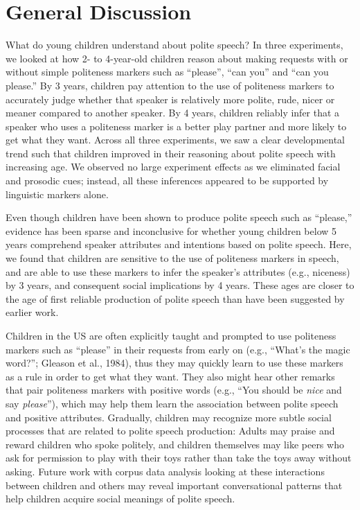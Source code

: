 \documentclass[10pt, letterpaper]{article}
\begin{document}
\section{General Discussion}\label{general-discussion}

What do young children understand about polite speech? In three
experiments, we looked at how 2- to 4-year-old children reason about
making requests with or without simple politeness markers such as
``please'', ``can you'' and ``can you please.'' By 3 years, children pay
attention to the use of politeness markers to accurately judge whether
that speaker is relatively more polite, rude, nicer or meaner compared
to another speaker. By 4 years, children reliably infer that a speaker
who uses a politeness marker is a better play partner and more likely to
get what they want. Across all three experiments, we saw a clear
developmental trend such that children improved in their reasoning about
polite speech with increasing age. We observed no large experiment
effects as we eliminated facial and prosodic cues; instead, all these
inferences appeared to be supported by linguistic markers alone.

Even though children have been shown to produce polite speech such as
``please,'' evidence has been sparse and inconclusive for whether young
children below 5 years comprehend speaker attributes and intentions
based on polite speech. Here, we found that children are sensitive to
the use of politeness markers in speech, and are able to use these
markers to infer the speaker's attributes (e.g., niceness) by 3 years,
and consequent social implications by 4 years. These ages are closer to
the age of first reliable production of polite speech than have been
suggested by earlier work.

Children in the US are often explicitly taught and prompted to use
politeness markers such as ``please'' in their requests from early on
(e.g., ``What's the magic word?''; Gleason et al., 1984), thus they may
quickly learn to use these markers as a rule in order to get what they
want. They also might hear other remarks that pair politeness markers
with positive words (e.g., ``You should be \emph{nice} and say
\emph{please}''), which may help them learn the association between
polite speech and positive attributes. Gradually, children may recognize
more subtle social processes that are related to polite speech
production: Adults may praise and reward children who spoke politely,
and children themselves may like peers who ask for permission to play
with their toys rather than take the toys away without asking. Future
work with corpus data analysis looking at these interactions between
children and others may reveal important conversational patterns that
help children acquire social meanings of polite speech.
\end{document}
